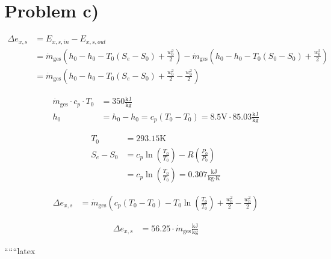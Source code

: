 \section*{Problem c)}

\begin{align*}
    \Delta e_{x,s} &= E_{x,s,in} - E_{x,s,out} \\
    &= \dot{m}_{\text{ges}} \left( h_{0} - h_{0} - T_{0}(S_{e} - S_{0}) + \frac{w_{0}^2}{2} \right) - \dot{m}_{\text{ges}} \left( h_{0} - h_{0} - T_{0}(S_{0} - S_{0}) + \frac{w_{0}^2}{2} \right) \\
    &= \dot{m}_{\text{ges}} \left( h_{0} - h_{0} - T_{0}(S_{e} - S_{0}) + \frac{w_{0}^2}{2} - \frac{w_{0}^2}{2} \right)
\end{align*}

\begin{align*}
    \dot{m}_{\text{ges}} \cdot c_{p} \cdot T_{0} &= 350 \frac{\text{kJ}}{\text{kg}} \\
    h_{0} &= h_{0} - h_{0} = c_{p}(T_{0} - T_{0}) = 8.5 \text{V} \cdot 85.03 \frac{\text{kJ}}{\text{kg}}
\end{align*}

\begin{align*}
    T_{0} &= 293.15 \text{K} \\
    S_{e} - S_{0} &= c_{p} \ln \left( \frac{T_{0}}{T_{0}} \right) - R \left( \frac{P_{0}}{P_{0}} \right) \\
    &= c_{p} \ln \left( \frac{T_{0}}{T_{0}} \right) = 0.307 \frac{\text{kJ}}{\text{kg} \cdot \text{K}}
\end{align*}

\begin{align*}
    \Delta e_{x,s} &= \dot{m}_{\text{ges}} \left( c_{p}(T_{0} - T_{0}) - T_{0} \ln \left( \frac{T_{0}}{T_{0}} \right) + \frac{w_{0}^2}{2} - \frac{w_{0}^2}{2} \right)
\end{align*}

\begin{align*}
    \Delta e_{x,s} &= 56.25 \cdot \dot{m}_{\text{ges}} \frac{\text{kJ}}{\text{kg}}
\end{align*}

``````latex
